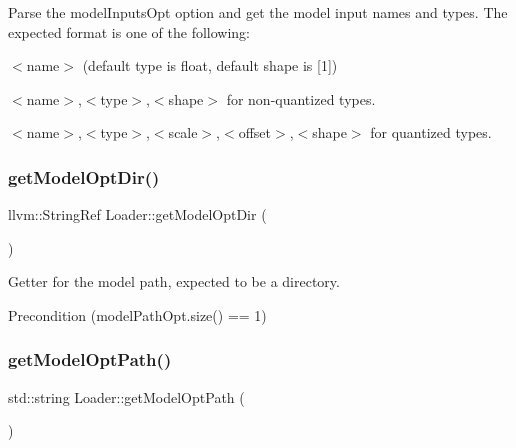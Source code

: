 Parse the \textquotesingle{}model\+Inputs\+Opt\textquotesingle{} option and get the model input names and types. The expected format is one of the following\+:
\begin{DoxyItemize}
\item $<$name$>$ (default type is \textquotesingle{}float\textquotesingle{}, default shape is \textquotesingle{}\mbox{[}1\mbox{]}\textquotesingle{})
\item $<$name$>$,$<$type$>$,$<$shape$>$ for non-\/quantized types.
\item $<$name$>$,$<$type$>$,$<$scale$>$,$<$offset$>$,$<$shape$>$ for quantized types. 
\end{DoxyItemize}\mbox{\label{classglow_1_1_loader_a4b7a9059016c43c4f81fa33d500a65f3}} 
\subsubsection{\texorpdfstring{get\+Model\+Opt\+Dir()}{getModelOptDir()}}
{\footnotesize\ttfamily llvm\+::\+String\+Ref Loader\+::get\+Model\+Opt\+Dir (\begin{DoxyParamCaption}{ }\end{DoxyParamCaption})\hspace{0.3cm}{\ttfamily [static]}}

Getter for the model path, expected to be a directory. \begin{DoxyPrecond}{Precondition}
(model\+Path\+Opt.\+size() == 1) 
\end{DoxyPrecond}
\mbox{\label{classglow_1_1_loader_af71f07b76373e50b28366c9250aedc84}} 
\subsubsection{\texorpdfstring{get\+Model\+Opt\+Path()}{getModelOptPath()}}
{\footnotesize\ttfamily std\+::string Loader\+::get\+Model\+Opt\+Path (\begin{DoxyParamCaption}{ }\end{DoxyParamCaption})\hspace{0.3cm}{\ttfamily [static]}}

